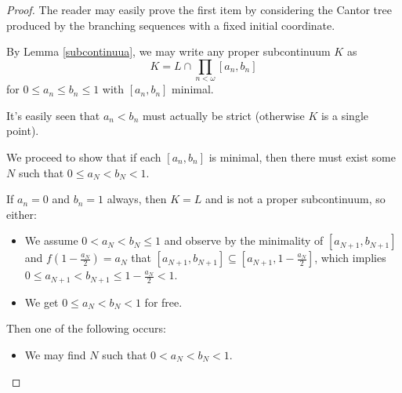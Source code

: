 \begin{proof}
The reader may easily prove the first item by considering the Cantor tree produced by the branching sequences with a fixed initial coordinate.

By Lemma \ref{subcontinuua}, we may write any proper subcontinuum $K$ as
  \[
    K = L \cap \prod_{n<\omega} [a_n,b_n] 
  \]
for $0\leq a_n \leq b_n \leq 1$ with $[a_n,b_n]$ minimal.

It's easily seen that $a_n < b_n$ must actually be strict (otherwise $K$ is a single point).

We proceed to show that if each $[a_n,b_n]$ is minimal, then there must exist some $N$ such that $0\leq a_N < b_N < 1$.

If $a_n=0$ and $b_n=1$ always, then $K=L$ and is not a proper subcontinuum, so either:
  \begin{itemize}
    \item We assume $0< a_N < b_N \leq 1$ and observe by the minimality of $[a_{N+1},b_{N+1}]$ and $f(1-\frac{a_N}{2})=a_N$ that $[a_{N+1},b_{N+1}]\subseteq[a_{N+1},1-\frac{a_N}{2}]$, which implies $0\leq a_{N+1} < b_{N+1} \leq 1 - \frac{a_N}{2} < 1$.
    \item We get $0\leq a_N < b_N < 1$ for free.
  \end{itemize}

Then one of the following occurs:
  \begin{itemize}
    \item We may find $N$ such that $0<a_N<b_N<1$.
  \end{itemize}
\end{proof}

